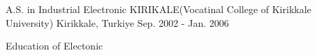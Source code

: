 
\begin{cventries}

  \cventry
    {A.S. in Industrial Electronic} %
    {KIRIKALE(Vocatinal College of Kirikkale University)} %
    {Kirikkale, Turkiye} %
    {Sep. 2002 - Jan. 2006} %
    {
      \begin{cvitems} %
        \item {Education of Electonic }
      \end{cvitems}
    }

\end{cventries}
